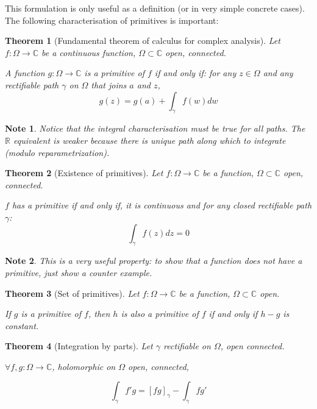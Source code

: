 \documentclass{article}
\newtheorem*{note}{Note}
\newtheorem*{thm*}{Theorem}
\begin{document}
This formulation is only useful as a definition (or in very simple concrete cases). The following characterisation of primitives is important:

\begin{thm*}[Fundamental theorem of calculus for complex analysis]
    Let $f: \Omega \rightarrow \mathbb{C}$ be a continuous function, $\Omega\subset\mathbb{C}$ open, connected.

    A function $g: \Omega \rightarrow \mathbb{C}$ is a primitive of $f$ if and only if: for any $z\in\Omega$ and any rectifiable path $\gamma$ on $\Omega$ that joins $a$ and $z$, 
    $$ g(z) = g(a) + \int_\gamma f(w)dw $$
\end{thm*}

\begin{note}
    Notice that the integral characterisation must be true for all paths. The $\mathbb{R}$ equivalent is weaker because there is unique path along which to integrate (modulo reparametrization).
\end{note}

\begin{thm*}[Existence of primitives]
    Let $f: \Omega \rightarrow \mathbb{C}$ be a function, $\Omega\subset\mathbb{C}$ open, connected.

    $f$ has a primitive if and only if, it is continuous and for any closed rectifiable path $\gamma$: 
    $$ \int_\gamma f(z)dz = 0 $$
\end{thm*}

\begin{note}
    This is a very useful property: to show that a function does not have a primitive, just show a counter example.
\end{note}

\begin{thm*}[Set of primitives]
    Let $f: \Omega \rightarrow \mathbb{C}$ be a function, $\Omega\subset\mathbb{C}$ open.

    If $g$ is a primitive of $f$, then $h$ is also a primitive of $f$ if and only if $h - g$ is constant.
\end{thm*}

\begin{thm*}[Integration by parts]
    Let $\gamma$ rectifiable on $\Omega$, open connected.
    
    
     $\forall f, g: \Omega \rightarrow \mathbb{C}$, holomorphic on $\Omega$ open, connected,

     $$ \int_\gamma f'g = [fg]_\gamma - \int_\gamma fg'$$
\end{thm*}
\end{document}
